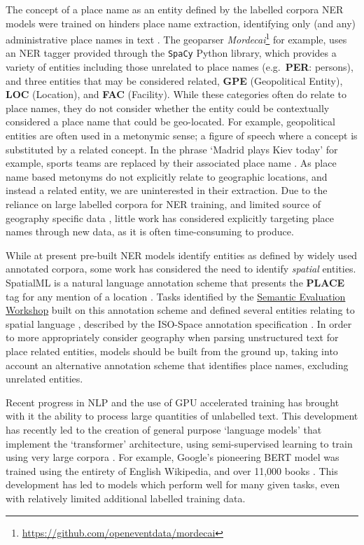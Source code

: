 \documentclass[]{interact}
\theoremstyle{plain}%
\theoremstyle{definition}
\theoremstyle{remark}
\begin{document}
The concept of a place name as an entity defined by the labelled corpora
NER models were trained on hinders place name extraction, identifying
only (and any) administrative place names in text \citep{gritta2017a}.
The geoparser \emph{Mordecai}\footnote{\url{https://github.com/openeventdata/mordecai}}
for example, uses an NER tagger provided through the \texttt{SpaCy}
Python library, which provides a variety of entities including those
unrelated to place names (e.g.~\textbf{PER}: persons), and three
entities that may be considered related, \textbf{GPE} (Geopolitical
Entity), \textbf{LOC} (Location), and \textbf{FAC} (Facility). While
these categories often do relate to place names, they do not consider
whether the entity could be contextually considered a place name that
could be geo-located. For example, geopolitical entities are often used
in a metonymic sense; a figure of speech where a concept is substituted
by a related concept. In the phrase `Madrid plays Kiev today' for
example, sports teams are replaced by their associated place name
\citep{gritta2020}. As place name based metonyms do not explicitly
relate to geographic locations, and instead a related entity, we are
uninterested in their extraction. Due to the reliance on large labelled
corpora for NER training, and limited source of geography specific data
\citep{karimzadeh2019}, little work has considered explicitly targeting
place names through new data, as it is often time-consuming to produce.

While at present pre-built NER models identify entities as defined by
widely used annotated corpora, some work has considered the need to
identify \emph{spatial} entities. SpatialML is a natural language
annotation scheme that presents the \textbf{PLACE} tag for any mention
of a location \citep{mani2010}. Tasks identified by the
\href{https://semeval.github.io/}{Semantic Evaluation Workshop} built on
this annotation scheme and defined several entities relating to spatial
language \citep[SemEval-2015 Task 8: SpaceEval,][]{pustejovsky2015},
described by the ISO-Space annotation specification
\citep{pustejovsky2017}. In order to more appropriately consider
geography when parsing unstructured text for place related entities,
models should be built from the ground up, taking into account an
alternative annotation scheme that identifies place names, excluding
unrelated entities.

Recent progress in NLP and the use of GPU accelerated training has
brought with it the ability to process large quantities of unlabelled
text. This development has recently led to the creation of general
purpose `language models' that implement the `transformer' architecture,
using semi-supervised learning to train using very large corpora
\citep{vaswani2017}. For example, Google's pioneering BERT model was
trained using the entirety of English Wikipedia, and over 11,000 books
\citep{devlin2019}. This development has led to models which perform
well for many given tasks, even with relatively limited additional
labelled training data.
\end{document}
